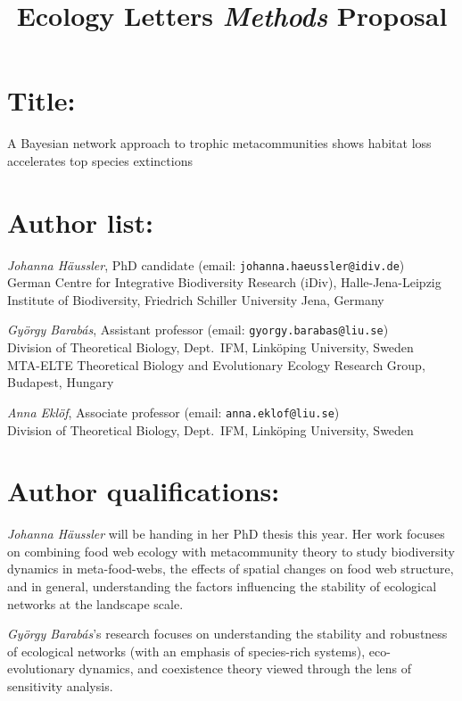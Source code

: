 \documentclass[11pt]{article}
\begin{document}
\title{Ecology Letters \emph{Methods} Proposal}
\author{}
\date{}


\maketitle



\section*{Title:}

A Bayesian network approach to trophic metacommunities shows habitat loss accelerates top species extinctions


\section*{Author list:}

\textit{Johanna H\"aussler}, PhD candidate (email: \texttt{johanna.haeussler@idiv.de})\\
German Centre for Integrative Biodiversity Research (iDiv), Halle-Jena-Leipzig\\
Institute of Biodiversity, Friedrich Schiller University Jena, Germany

\textit{Gy\"orgy Barab\'as}, Assistant professor (email: \texttt{gyorgy.barabas@liu.se})\\
Division of Theoretical Biology, Dept.\ IFM, Link\"oping University, Sweden\\
MTA-ELTE Theoretical Biology and Evolutionary Ecology Research Group, Budapest, Hungary

\textit{Anna Ekl\"of}, Associate professor (email: \texttt{anna.eklof@liu.se})\\
Division of Theoretical Biology, Dept.\ IFM, Link\"oping University, Sweden


\section*{Author qualifications:}
\textit{Johanna H\"aussler} will be handing in her PhD thesis this year. Her work focuses on combining food web ecology with metacommunity theory to study biodiversity dynamics in meta-food-webs, the effects of spatial changes on food web structure, and in general, understanding the factors influencing the stability of ecological networks at the landscape scale. 

\textit{Gy\"orgy Barab\'as}'s research focuses on understanding the stability and robustness of ecological networks (with an emphasis of species-rich systems), eco-evolutionary dynamics, and coexistence theory viewed through the lens of sensitivity analysis.
\end{document}
